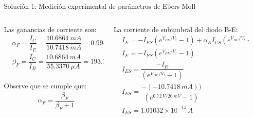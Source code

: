 \documentclass[t,aspectratio=169]{beamer}
\begin{document}
\begin{frame}{Solución 1: Medición experimental de parámetros de Ebers-Moll}

\begin{columns}
\begin{column}{0.5\textwidth}

Las ganancias de corriente son:
%
\begin{align*}
& \alpha_F = \dfrac{I_C}{I_E} = \dfrac{10.6864\ mA}{10.7418\ mA} = 0.99484 \\
& \beta_F = \dfrac{I_C}{I_B} = \dfrac{10.6864\ mA}{55.3370\ \mu A} = 193.12 \\
\end{align*}

Observe que se cumple que:
%
\begin{align*}
& \alpha_F = \dfrac{\beta_F}{\beta_F + 1} \\
\end{align*}

\end{column}
\begin{column}{0.5\textwidth}

La corriente de subumbral del diodo B-E:
%
\begin{align*}
& I_E = -I_{ES} (e^{V_{BE}/V_t} - 1) + \alpha_R I_{CS} (e^{V_{BC}/V_t} - 1) \\
& I_E = -I_{ES} (e^{V_{BE}/V_t} - 1) \\
& I_{ES} = \dfrac{-I_E}{(e^{V_{BE}/V_t} - 1)} \\
& I_{ES} = \dfrac{-(-10.7418\ mA))}{(e^{0.72\ V/26\ mV} - 1)} \\
& I_{ES} = 1.01032\times{}10^{-14}\ A \\
\end{align*}

\end{column}
\end{columns}

\end{frame}
\end{document}
